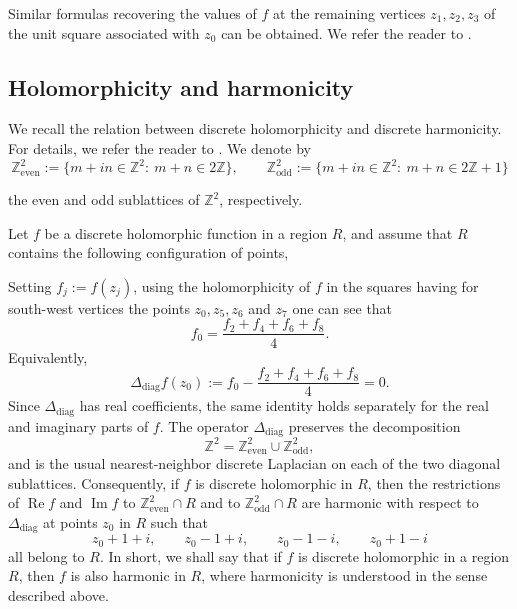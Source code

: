 \documentclass[12pt,a4paper,reqno]{amsart}
\theoremstyle{definition}
\theoremstyle{definition}\newtheorem{defn}[thm]{Definition}
\begin{document}
    Similar formulas recovering the values of $f$ at the remaining vertices
    $z_1,z_2,z_3$ of the unit square associated with $z_0$ can be obtained.
    We refer the reader to \cite[Section 3]{D}.
    
    
    \subsection{Holomorphicity and harmonicity}\label{s:harmonicity}
    
    We recall the relation between discrete holomorphicity and discrete harmonicity. For details, we refer the reader to \cite[Section 2]{D}. We denote by
    \[
    \mathbb Z^2_{\mathrm{even}}
    :=
    \{m+in\in\mathbb Z^2:\ m+n\in 2\mathbb Z\}, \qquad \mathbb Z^2_{\mathrm{odd}}
    :=
    \{m+in\in\mathbb Z^2:\ m+n\in 2\mathbb Z+1\}
    \]
    
    the even and odd sublattices of \(\mathbb Z^2\), respectively.
    
    Let \(f\) be a discrete holomorphic function in a region \(R\), and assume that
    \(R\) contains the following configuration of points,
    
    \begin{center}
    \end{center}
    Setting \(f_j:=f(z_j)\), using the holomorphicity of $f$ in the squares having for south-west vertices the points $z_0,z_5,z_6$ and $z_7$ one can see that
    \begin{equation*}
    f_0=\frac{f_2+f_4+f_6+f_8}{4}.
    \end{equation*}
    Equivalently,
    \[
    \Delta_{\mathrm{diag}} f(z_0)
    :=f_0-
    \frac{f_2+f_4+f_6+f_8}{4}
    =
    0.
    \]
    Since \(\Delta_{\mathrm{diag}}\) has real coefficients, the same identity holds
    separately for the real and imaginary parts of \(f\). The operator \(\Delta_{\mathrm{diag}}\) preserves the decomposition
    \[
    \mathbb Z^2=\mathbb Z^2_{\mathrm{even}}\cup \mathbb Z^2_{\mathrm{odd}},
    \]
    and is the usual nearest-neighbor discrete Laplacian on each of the two
    diagonal sublattices. Consequently, if \(f\) is discrete holomorphic in \(R\),
    then the restrictions of \(\operatorname{Re} f\) and \(\operatorname{Im} f\) to
    \(\mathbb Z^2_{\mathrm{even}}\cap R\) and to
    \(\mathbb Z^2_{\mathrm{odd}}\cap R\) are harmonic with respect to
    \(\Delta_{\mathrm{diag}}\) at points
    $z_0$ in $R$ such that 
    \[
    z_0+1+i,\qquad z_0-1+i,\qquad z_0-1-i,\qquad z_0+1-i
    \]
    all belong to \(R\). 
    In short, we shall say that if \(f\) is discrete holomorphic in a region \(R\),
    then \(f\) is also harmonic in \(R\), where harmonicity is understood in the
    sense described above.
    
\end{document}
